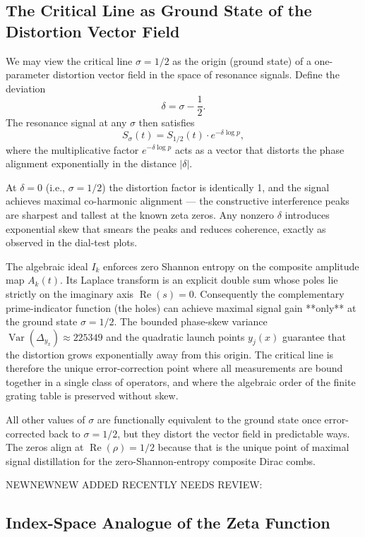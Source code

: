 \documentclass[11pt,a4paper]{article}
\begin{document}
\subsection{The Critical Line as Ground State of the Distortion Vector Field}

We may view the critical line \(\sigma=1/2\) as the origin (ground state) of a one-parameter distortion vector field in the space of resonance signals. Define the deviation
\[
\delta = \sigma - \frac12.
\]
The resonance signal at any \(\sigma\) then satisfies
\[
S_\sigma(t) = S_{1/2}(t) \cdot e^{-\delta \log p},
\]
where the multiplicative factor \(e^{-\delta \log p}\) acts as a vector that distorts the phase alignment exponentially in the distance \(|\delta|\).

At \(\delta=0\) (i.e., \(\sigma=1/2\)) the distortion factor is identically 1, and the signal achieves maximal co-harmonic alignment — the constructive interference peaks are sharpest and tallest at the known zeta zeros. Any nonzero \(\delta\) introduces exponential skew that smears the peaks and reduces coherence, exactly as observed in the dial-test plots.

The algebraic ideal \(I_k\) enforces zero Shannon entropy on the composite amplitude map \(A_k(t)\). Its Laplace transform is an explicit double sum whose poles lie strictly on the imaginary axis \(\operatorname{Re}(s)=0\). Consequently the complementary prime-indicator function (the holes) can achieve maximal signal gain **only** at the ground state \(\sigma=1/2\). The bounded phase-skew variance \(\operatorname{Var}(\Delta_{y_x})\approx225349\) and the quadratic launch points \(y_j(x)\) guarantee that the distortion grows exponentially away from this origin. The critical line is therefore the unique error-correction point where all measurements are bound together in a single class of operators, and where the algebraic order of the finite grating table is preserved without skew.

All other values of \(\sigma\) are functionally equivalent to the ground state once error-corrected back to \(\sigma=1/2\), but they distort the vector field in predictable ways. The zeros align at \(\operatorname{Re}(\rho)=1/2\) because that is the unique point of maximal signal distillation for the zero-Shannon-entropy composite Dirac combs.



NEWNEWNEW ADDED RECENTLY NEEDS REVIEW:

\subsection{Index-Space Analogue of the Zeta Function}
\end{document}
